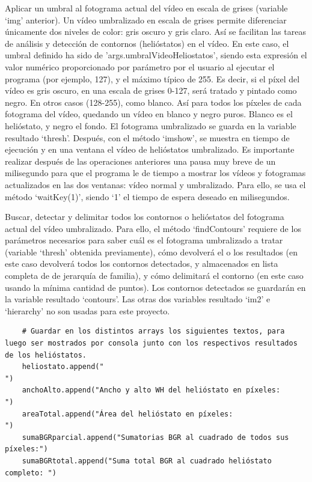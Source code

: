 Aplicar un umbral al fotograma actual del vídeo en escala de grises (variable ‘img’ anterior). Un vídeo umbralizado en escala de grises permite diferenciar únicamente dos niveles de color: gris oscuro y gris claro. Así se facilitan las tareas de análisis y detección de contornos (helióstatos) en el vídeo. En este caso, el umbral definido ha sido de 'args.umbralVideoHeliostatos', siendo esta expresión el valor numérico proporcionado por parámetro por el usuario al ejecutar el programa (por ejemplo, 127), y el máximo típico de 255. Es decir, si el píxel del vídeo es gris oscuro, en una escala de grises 0-127, será tratado y pintado como negro. En otros casos (128-255), como blanco. Así para todos los píxeles de cada fotograma del vídeo, quedando un vídeo en blanco y negro puros. Blanco es el helióstato, y negro el fondo. El fotograma umbralizado se guarda en la variable resultado ‘thresh’. Después, con el método ‘imshow’, se muestra en tiempo de ejecución y en una ventana el vídeo de helióstatos umbralizado. Es importante realizar después de las operaciones anteriores una pausa muy breve de un milisegundo para que el programa le de tiempo a mostrar los vídeos y fotogramas actualizados en las dos ventanas: vídeo normal y umbralizado. Para ello, se usa el método ‘waitKey(1)’, siendo ‘1’ el tiempo de espera deseado en milisegundos.

Buscar, detectar y delimitar todos los contornos o helióstatos del fotograma actual del vídeo umbralizado. Para ello, el método ‘findContours’ requiere de los parámetros necesarios para saber cuál es el fotograma umbralizado a tratar (variable ‘thresh’ obtenida previamente), cómo devolverá el o los resultados (en este caso devolverá todos los contornos detectados, y almacenados en lista completa de de jerarquía de familia), y cómo delimitará el contorno (en este caso usando la mínima cantidad de puntos). Los contornos detectados se guardarán en la variable resultado ‘contours’. Las otras dos variables resultado ‘im2’ e ‘hierarchy’ no son usadas para este proyecto.\\[20pt]

\begin{lstlisting}
	# Guardar en los distintos arrays los siguientes textos, para luego ser mostrados por consola junto con los respectivos resultados de los helióstatos.
    heliostato.append("                                               ")
    anchoAlto.append("Ancho y alto WH del helióstato en píxeles:      ")
    areaTotal.append("Área del helióstato en píxeles:                 ")
    sumaBGRparcial.append("Sumatorias BGR al cuadrado de todos sus píxeles:")
    sumaBGRtotal.append("Suma total BGR al cuadrado helióstato completo: ")
\end{lstlisting}
    

